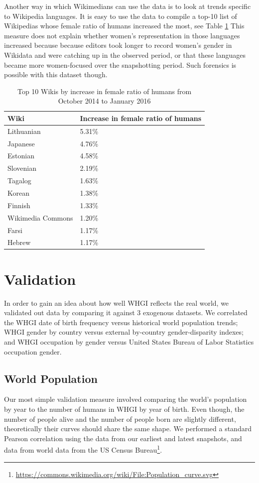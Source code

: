 \documentclass[letterpaper]{article}
\begin{document}
Another way in which Wikimedians can use the data is to look at trends specific to Wikipedia languages. It is easy to use the data to compile a top-10 list of Wikipedias whose female ratio of humans increased the most, see Table \ref{table:top10} This measure does not explain whether women's representation in those languages increased because because editors took longer to record women's gender in Wikidata and were catching up in the observed period, or that these languages became more women-focused over the snapshotting period. Such forensics is possible with this dataset though.

\begin{table}
\caption{Top 10 Wikis by increase in female ratio of humans from October 2014 to January 2016}
\label{table:top10}
\begin{tabular}{p{2cm}p{2cm}}
\toprule
{Wiki} &     Increase in female ratio of humans  \\
\midrule
Lithuanian      & 5.31\% \\
Japanese     & 4.76\% \\
Estonian      & 4.58\% \\
Slovenian      & 2.19\% \\
Tagalog      & 1.63\% \\
Korean      & 1.38\% \\
Finnish      & 1.33\% \\
Wikimedia Commons & 1.20\% \\
Farsi      & 1.17\% \\
Hebrew      & 1.17\% \\
\bottomrule
\end{tabular}


\end{table}

\section{Validation}
In order to gain an idea about how well WHGI reflects the real world, we validated out data by comparing it against 3 exogenous datasets. We correlated the WHGI date of birth frequency versus historical world population trends; WHGI gender by country versus external by-country gender-disparity indexes; and WHGI occupation by gender versus United States Bureau of Labor Statistics occupation gender.

\subsection{World Population}
Our most simple validation measure involved comparing the world's population by year to the number of humans in WHGI by year of birth. Even though, the number of people alive and the number of people born are slightly different, theoretically their curves should share the same shape. We performed a standard Pearson correlation using the data from our earliest and latest snapshots, and data from world data from the US Census Bureau\footnote{\url{https://commons.wikimedia.org/wiki/File:Population_curve.svg}}. 
\end{document}
